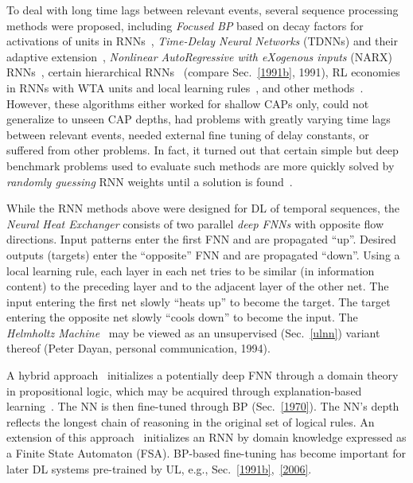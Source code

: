 \documentclass[letterpaper]{article}
\begin{document}
\begin{CJK*}{UTF8}{gbsn}
To deal with long time lags between relevant events, 
several sequence processing methods were proposed, 
including 
{\em Focused BP} based on decay 
factors for activations of units in RNNs~\citep{Mozer:89focus,Mozer:92nips},
{\em  Time-Delay Neural Networks} (TDNNs) \citep{Lang:90} and their 
adaptive extension~\citep{Bodenhausen:91},
{\em Nonlinear AutoRegressive with eXogenous inputs} (NARX) RNNs~\citep{Lin:96},
certain hierarchical RNNs~\citep{hihi:95} (compare Sec.~\ref{1991b}, 1991),
RL economies in RNNs with WTA units and local learning rules~\citep{Schmidhuber:89cs},
and other methods~\citep[e.g.,][]{Ring:93,Ring:94,Plate:93,Vries:91,Sun:93,Bengio:94}.
However, these algorithms either worked for shallow CAPs only,
could not generalize to unseen CAP depths,
had problems with greatly varying time lags between relevant events,
needed external fine tuning of delay constants,
or suffered from other problems.
In fact, it turned out that certain simple but deep benchmark problems 
used to evaluate such methods 
are more quickly solved by {\em randomly guessing} RNN weights until a solution is found~\citep{Hochreiter:96sintra}.

While the RNN methods above were designed for DL of temporal sequences,
the {\em Neural Heat Exchanger} \citep{heat90-96} consists of two parallel {\em deep FNNs} with opposite flow directions. Input patterns enter the first FNN and are propagated ``up''. Desired outputs (targets) enter the ``opposite'' FNN and are propagated ``down''. Using a local learning rule, each layer in each net tries to be similar (in information content) to the preceding layer and to the adjacent  layer of the other net. The input entering the first net slowly ``heats up'' to become the target. The target entering the opposite net slowly ``cools down'' to become the input. The {\em Helmholtz Machine}~\citep{Dayan:95,Dayan:96} may be viewed as an unsupervised (Sec.~\ref{ulnn})
variant thereof (Peter Dayan, personal communication, 1994). 



A hybrid approach~\citep{shavlik1989,towell1994} initializes a potentially deep FNN through 
a domain theory in propositional logic,
which may be acquired through explanation-based learning~\citep{mitchell1986,dejong1986,minton1989}.
The NN is then fine-tuned through BP (Sec.~\ref{1970}).
The NN's depth reflects the longest chain of reasoning in the original set of logical rules.
An extension of this approach~\citep{maclin1993,shavlik1994} initializes an RNN by 
domain knowledge expressed as a Finite State Automaton (FSA).
BP-based fine-tuning has become important for later DL systems 
pre-trained by UL, e.g., Sec.~\ref{1991b},~\ref{2006}.


\end{CJK*}
\end{document}
